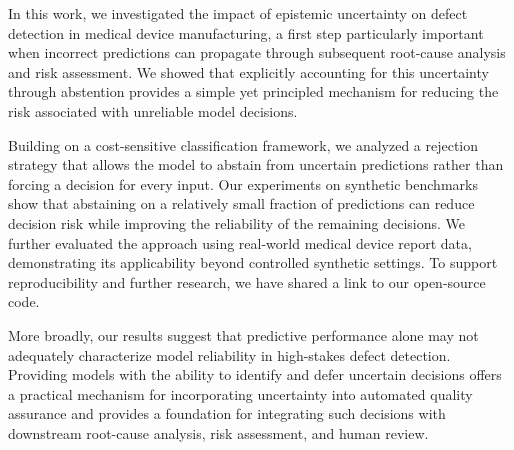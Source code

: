 In this work, we investigated the impact of epistemic uncertainty on defect detection in medical device manufacturing, a first step particularly important when incorrect predictions can propagate through subsequent root-cause analysis and risk assessment. We showed that explicitly accounting for this uncertainty through abstention provides a simple yet principled mechanism for reducing the risk associated with unreliable model decisions.

Building on a cost-sensitive classification framework, we analyzed a rejection strategy that allows the model to abstain from uncertain predictions rather than forcing a decision for every input. Our experiments on synthetic benchmarks show that abstaining on a relatively small fraction of predictions can reduce decision risk while improving the reliability of the remaining decisions. We further evaluated the approach using real-world medical device report data, demonstrating its applicability beyond controlled synthetic settings. To support reproducibility and further research, we have shared a link to our open-source code.

More broadly, our results suggest that predictive performance alone may not adequately characterize model reliability in high-stakes defect detection. Providing models with the ability to identify and defer uncertain decisions offers a practical mechanism for incorporating uncertainty into automated quality assurance and provides a foundation for integrating such decisions with downstream root-cause analysis, risk assessment, and human review.

